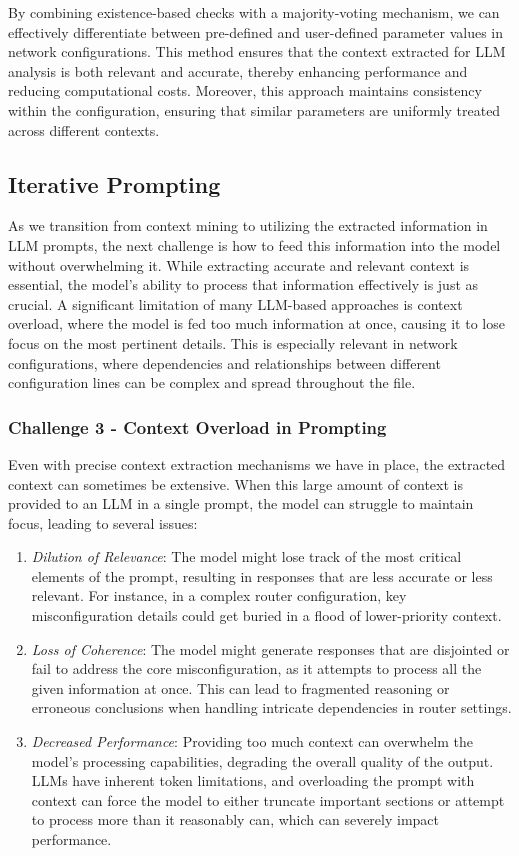 By combining existence-based checks with a majority-voting mechanism, we can effectively differentiate between pre-defined and user-defined parameter values in network configurations. This method ensures that the context extracted for LLM analysis is both relevant and accurate, thereby enhancing performance and reducing computational costs. Moreover, this approach maintains consistency within the configuration, ensuring that similar parameters are uniformly treated across different contexts.


\subsection{Iterative Prompting}\label{prompting_method}
As we transition from context mining to utilizing the extracted information in LLM prompts, the next challenge is how to feed this information into the model without overwhelming it. While extracting accurate and relevant context is essential, the model's ability to process that information effectively is just as crucial. A significant limitation of many LLM-based approaches is context overload, where the model is fed too much information at once, causing it to lose focus on the most pertinent details. This is especially relevant in network configurations, where dependencies and relationships between different configuration lines can be complex and spread throughout the file.

\subsubsection{Challenge 3 - Context Overload in Prompting}
\label{challenge_3}

Even with precise context extraction mechanisms we have in place, the extracted context can sometimes be extensive. When this large amount of context is provided to an LLM in a single prompt, the model can struggle to maintain focus, leading to several issues:
\begin{enumerate}
    \item \textit{Dilution of Relevance}: The model might lose track of the most critical elements of the prompt, resulting in responses that are less accurate or less relevant. For instance, in a complex router configuration, key misconfiguration details could get buried in a flood of lower-priority context.
    \item \textit{Loss of Coherence}: The model might generate responses that are disjointed or fail to address the core misconfiguration, as it attempts to process all the given information at once. This can lead to fragmented reasoning or erroneous conclusions when handling intricate dependencies in router settings.
    \item \textit{Decreased Performance}: Providing too much context can overwhelm the model’s processing capabilities, degrading the overall quality of the output. LLMs have inherent token limitations, and overloading the prompt with context can force the model to either truncate important sections or attempt to process more than it reasonably can, which can severely impact performance.
\end{enumerate}

